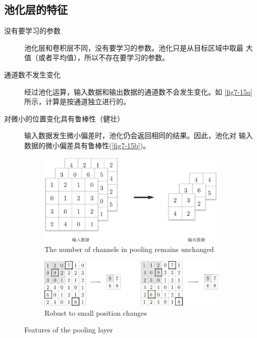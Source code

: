 \subsection*{池化层的特征}
\begin{description}
    \item[没有要学习的参数] 池化层和卷积层不同，没有要学习的参数。池化只是从目标区域中取最
        大值（或者平均值），所以不存在要学习的参数。
    \item[通道数不发生变化]
        经过池化运算，输入数据和输出数据的通道数不会发生变化。如 \autoref{fig7-15a} 所示，计算是按通道独立进行的。
    \item[对微小的位置变化具有鲁棒性（健壮）]
        输入数据发生微小偏差时，池化仍会返回相同的结果。因此，池化对
        输入数据的微小偏差具有鲁棒性(\autoref{fig7-15b})。
\end{description}
\begin{figure}
    \centering
    \begin{subfigure}{.45\textwidth}
        \includegraphics[width=\textwidth]{Figures/The number of channels in pooling remains unchanged.png}
        \caption{The number of channels in pooling remains unchanged}
        \label{fig7-15a}
    \end{subfigure}
    \hfill
    \begin{subfigure}{.45\textwidth}
        \includegraphics[width=\textwidth]{Figures/Robust to small position changes.png}
        \caption{Robust to small position changes}
        \label{fig7-15b}
    \end{subfigure}
    \caption{Features of the pooling layer}
    \label{fig7-15}
\end{figure}
